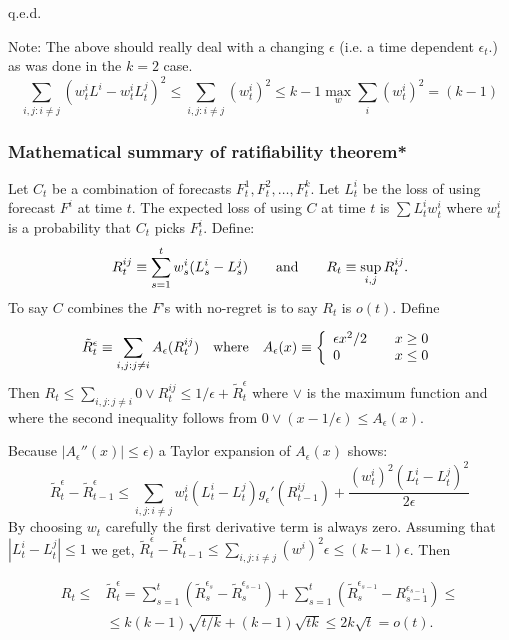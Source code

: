 \documentclass{book}
\newcommand{\notes}{\index{personal notes}}
\begin{document}
\hfill q.e.d.

{\notes Note: The above should really deal with a changing $\epsilon$ (i.e. a
time dependent $\epsilon_t$.) as was done in the $k=2$ case.} 
\begin{displaymath}
 \displaystyle \sum_{i,j:i \ne j}(w^i_t L^i - w^i_t L^j_t)^2 \le
\sum_{i,j:i \ne j} (w^i_t)^2 \le k-1 \max_w \sum_i (w_t^i)^2 = (k-1) 
\end{displaymath}


 
           \subsubsection[Summary*]{Mathematical summary of ratifiability theorem*}
%

Let $C_t$ be a combination of forecasts $F^1_t, F^2_t, \ldots,F^k_t$.
Let $L^i_t$ be the loss of using forecast $F^i$ at time $t$. The
expected loss of using $C$ at time $t$ is $\sum L^i_t w^i_t$ where
$w^i_t$ is a probability that $C_t$ picks $F^i_t$.  Define:
$$ R^{ij}_t \equiv \sum_{s=1}^t w^i_s(L^i_s - L^j_s) \qquad \hbox{and}
\qquad R_t \equiv \sup_{i,j} R^{ij}_t.
$$ To say $C$ combines the $F$'s with no-regret is to say $R_t$ is
$o(t).$ Define

        $$ \tilde{R}^\epsilon_t \equiv \sum_{i,j:j \neq i}
        A_\epsilon(R^{ij}_t) \quad \hbox{where} \quad
        A_\epsilon(x) \equiv \left\{
  \begin{array}{l@{\qquad}l}
    \epsilon x^2/2 & x \ge 0 \\ 0 & x \le 0
  \end{array}
\right.
$$ Then $ \displaystyle R_t \le \sum_{i,j:j \neq i} 0 \vee R^{ij}_t
\le 1/\epsilon + \tilde{R}^\epsilon_t$ where $\vee$ is the maximum
function and where the second inequality follows from $ 0 \vee (x
-1/\epsilon) \le A_\epsilon(x)$.

Because $|A_\epsilon''(x)| \le \epsilon)$ a Taylor expansion of
$A_\epsilon(x)$ shows:
$$ \tilde{R}^\epsilon_t -\tilde{R}^\epsilon_{t-1} \le \sum_{i,j:i \ne j}
w^i_t(L_t^i - L_t^j) g_\epsilon'(R^{ij}_{t-1}) +
\frac{(w^i_t)^2( L_t^i - L_t^j)^2}{2\epsilon}
$$ By choosing $w_t$ carefully the first derivative term is always
zero.  Assuming that $|L^i_t - L^j_t| \le 1$ we get, $ \displaystyle
\tilde{R}^\epsilon_t -\tilde{R}^\epsilon_{t-1} \le \sum_{i,j:i \ne j}
(w^i)^2\epsilon \le (k-1)\epsilon$.  Then


  \begin{eqnarray*}
    \displaystyle R_t \le & \displaystyle \tilde{R}^\epsilon_t =
    \sum_{s=1}^t \left(\tilde R^{\epsilon_s}_s - \tilde
    R^{\epsilon_{s-1}}_s\right) + \sum_{s=1}^t \left(\tilde
    R^{\epsilon_{s-1}}_s - R^{\epsilon_{s-1}}_{s-1}\right) \le \\ &
    \displaystyle \le k(k-1)\sqrt{t/k} + (k-1)\sqrt{tk} \le
    2k\sqrt{t} = o(t).
  \end{eqnarray*}
\end{document}
